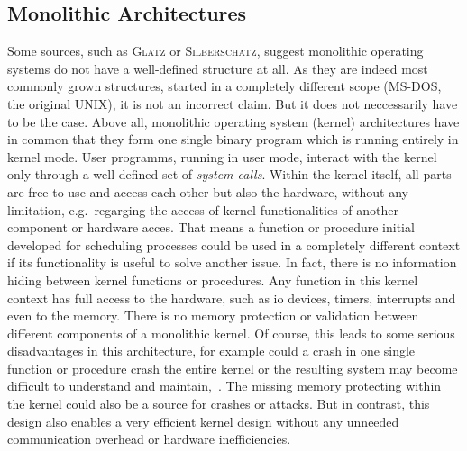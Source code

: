 \subsection{Monolithic Architectures}\label{sec:monolithic-archs}
Some sources, such as \textsc{Glatz}\cite{glatz2015betriebssysteme} or \textsc{Silberschatz}\cite{silberschatz2009operating}, suggest monolithic operating systems do not have a well-defined structure at all. 
As they are indeed most commonly grown structures, started in a completely different scope (MS-DOS, the original UNIX), it is not an incorrect claim.
But it does not neccessarily have to be the case.
Above all, monolithic operating system (kernel) architectures have in common that they form one single binary program which is running entirely in kernel mode.
User programms, running in user mode, interact with the kernel only through a well defined set of \textit{system calls}\cite{lfd430}. 
Within the kernel itself, all parts are free to use and access each other but also the hardware, without any limitation, e.g.\ regarging the access of kernel functionalities of another component or hardware acces. 
That means a function or procedure initial developed for scheduling processes could be used in a completely different context if its functionality is useful to solve another issue.
In fact, there is no information hiding between kernel functions or procedures.
Any function in this kernel context has full access to the hardware, such as \ac{io} devices, timers, interrupts and even to the memory. 
There is no memory protection or validation between different components of a monolithic kernel. 
Of course, this leads to some serious disadvantages in this architecture, for example could a crash in one single function or procedure crash the entire kernel or the resulting system may become difficult to understand and maintain\cite{tanenbaum-modern-operating-systems},~\cite{silberschatz2009operating}.
The missing memory protecting within the kernel could also be a source for crashes or attacks.
But in contrast, this design also enables a very efficient kernel design without any unneeded communication overhead or hardware inefficiencies\cite{lfd430}.

